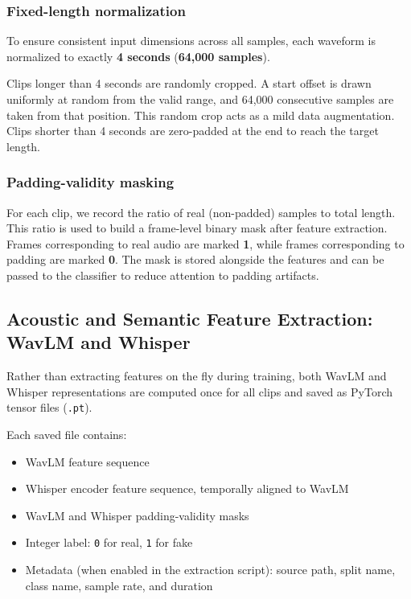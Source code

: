 \documentclass[11pt,a4paper]{article}
\begin{document}
\subsubsection{Fixed-length normalization}

To ensure consistent input dimensions across all samples, each waveform is
normalized to exactly \textbf{4 seconds} (\textbf{64,000 samples}).

Clips longer than 4 seconds are randomly cropped. A start offset is drawn
uniformly at random from the valid range, and 64,000 consecutive samples are taken
from that position. This random crop acts as a mild data augmentation. Clips
shorter than 4 seconds are zero-padded at the end to reach the target length.

\subsubsection{Padding-validity masking}

For each clip, we record the ratio of real (non-padded) samples to total length.
This ratio is used to build a frame-level binary mask after feature extraction.
Frames corresponding to real audio are marked \textbf{1}, while frames
corresponding to padding are marked \textbf{0}. The mask is stored alongside the
features and can be passed to the classifier to reduce attention to padding
artifacts.

\subsection{Acoustic and Semantic Feature Extraction: WavLM and Whisper}

Rather than extracting features on the fly during training, both WavLM and Whisper
representations are computed once for all clips and saved as PyTorch tensor files
(\texttt{.pt}).

Each saved file contains:

\begin{itemize}[noitemsep]
  \item WavLM feature sequence
  \item Whisper encoder feature sequence, temporally aligned to WavLM
  \item WavLM and Whisper padding-validity masks
  \item Integer label: \texttt{0} for real, \texttt{1} for fake
  \item Metadata (when enabled in the extraction script): source path, split name,
        class name, sample rate, and duration
\end{itemize}
\end{document}
